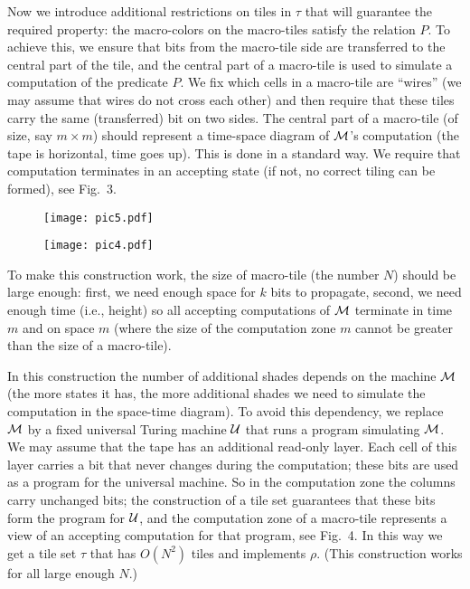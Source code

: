 \documentclass[runningheads]{llncs}
\begin{document}
 Now we introduce additional restrictions on tiles in $\tau$ that will guarantee the required property:  the macro-colors on the macro-tiles satisfy the relation $P$. To achieve this, we ensure that bits from the macro-tile side are transferred to the central part of the tile, and the central part of a macro-tile is used to simulate  a  computation of the predicate $P$.
We fix which cells in a macro-tile are ``wires'' (we may assume that wires do not cross each other) and then require that these tiles carry the same (transferred) bit on two sides. The central part of a macro-tile (of size, say $m\times m$) should represent a time-space diagram of $\cal M$'s computation (the tape is horizontal, time goes up). This is done in a standard way. We require that computation terminates in an accepting state (if not, no correct tiling can be formed), see Fig.~3.
\begin{figure}
\center
\begin{minipage}[b]{0.45\linewidth}
\center
\texttt{[image: pic5.pdf]}
\label{pic3}
\caption{}
\end{minipage}
\begin{minipage}[b]{0.45\linewidth}
\center
\texttt{[image: pic4.pdf]}
\label{pic4}
\caption{}
\end{minipage}
\end{figure}


  To make this construction work, the size of macro-tile (the number $N$) should be large enough: first, we need enough space for $k$ bits to propagate, second, we need enough time (i.e., height) so all accepting computations of $\cal M$ terminate in time $m$ and on space $m$ (where the size of the computation zone $m$ cannot be greater than the size of a macro-tile).
 
In this construction the number of additional shades depends on the machine $\cal M$ (the more states it has, the more additional shades we need to simulate the computation in the space-time diagram). To avoid this dependency, we replace $\cal M$ by a fixed universal Turing machine $\cal U$ that runs a program simulating $\cal M$.  We may assume that the tape has an additional read-only layer. Each cell of this layer carries a bit that never  changes during the computation; these bits are used as a program for the universal machine. So in the computation zone the columns carry unchanged bits; the construction of a tile set  guarantees that these bits form the program for $\cal U$, and the computation zone of a macro-tile represents a view of an accepting computation for that program, see Fig.~4. In this way we get a tile set $\tau$ that has $O(N^2)$ tiles and implements $\rho$. (This construction works for all large enough $N$.)
\end{document}
